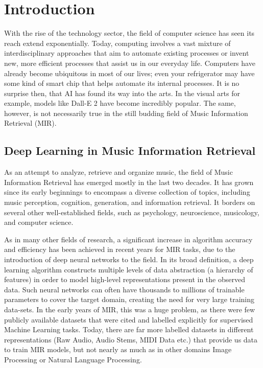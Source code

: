 \documentclass[../main.tex]{subfiles}
\begin{document}
\newpage
\section{Introduction}

With the rise of the technology sector, the field of computer science has seen its reach extend exponentially. Today, computing involves a vast mixture of interdisciplinary approaches that aim to automate existing processes or invent new, more efficient processes that assist us in our everyday life. Computers have already become ubiquitous in most of our lives; even your refrigerator may have some kind of smart chip that helps automate its internal processes. It is no surprise then, that AI has found its way into the arts. In the visual arts for example, models like Dall-E 2 have become incredibly popular. The same, however, is not necessarily true in the still budding field of Music Information Retrieval (MIR).

\subsection{Deep Learning in Music Information Retrieval}

As an attempt to analyze, retrieve and organize music, the field of Music Information Retrieval has emerged mostly in the last two decades. It has grown since its early beginnings to encompass a diverse collection of topics, including music perception, cognition, generation, and information retrieval. It borders on several other well-established fields, such as psychology, neuroscience, musicology, and computer science.

As in many other fields of research, a significant increase in algorithm accuracy and efficiency has been achieved in recent years for MIR tasks, due to the introduction of deep neural networks to the field. In its broad definition, a deep learning algorithm constructs multiple levels of data abstraction (a hierarchy of features) in order to model high-level representations present in the observed data. Such neural networks can often have thousands to millions of trainable parameters to cover the target domain, creating the need for very large training data-sets. In the early years of MIR, this was a huge problem, as there were few publicly available datasets that were cited and labelled explicitly for supervised Machine Learning tasks. Today, there are far more  labelled datasets in different representations (Raw Audio, Audio Stems, MIDI Data etc.) that provide us data to train MIR models, but not nearly as much as in other domains Image Processing or Natural Language Processing.
\end{document}
